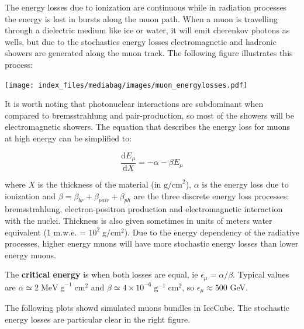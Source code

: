 \documentclass[
  letterpaper,
  DIV=11,
  numbers=noendperiod]{scrreprt}
\begin{document}
The energy losses due to ionization are continuous while in radiation
processes the energy is lost in bursts along the muon path. When a muon
is travelling through a dielectric medium like ice or water, it will
emit cherenkov photons as wells, but due to the stochastics energy
losses electromagnetic and hadronic showers are generated along the muon
track. The following figure illustrates this process:

\texttt{[image: index\_files/mediabag/images/muon\_energylosses.pdf]}

It is worth noting that photonuclear interactions are subdominant when
compared to bremsstrahlung and pair-production, so most of the showers
will be electromagnetic showers. The equation that describes the energy
loss for muons at high energy can be simplified to:

\[\frac{\mathrm{ d}E_\mu}{\mathrm{ d}X} = -\alpha -\beta E_\mu\]

where \(X\) is the thickness of the material (in \(\mathrm{ g/cm}^2\)),
\(\alpha\) is the energy loss due to ionization and
\(\beta = \beta_{br} + \beta_{pair} + \beta_{ph}\) are the three
discrete energy loss processes: bremsstrahlung, electron-positron
production and electromagnetic interaction with the nuclei. Thickness is
also given sometimes in units of meters water equivalent (1 m.w.e. =
\(10^2 \mathrm{\; g/cm^2}\)). Due to the energy dependency of the
radiative processes, higher energy muons will have more stochastic
energy losses than lower energy muons.

The \textbf{critical energy} is when both losses are equal, ie
\(\epsilon_\mu = \alpha/\beta\). Typical values are
\(\alpha \simeq 2 \mathrm{ \;MeV\;g}^{-1} \mathrm{ \;cm}^2\) and
\(\beta \simeq 4 \times 10^{-6} \;\mathrm{ g^{-1}\;cm^2}\), so
\(\epsilon_\mu \approx 500\) GeV.

The following plots showd simulated muons bundles in IceCube. The
stochastic energy losses are particular clear in the right figure.
\end{document}
